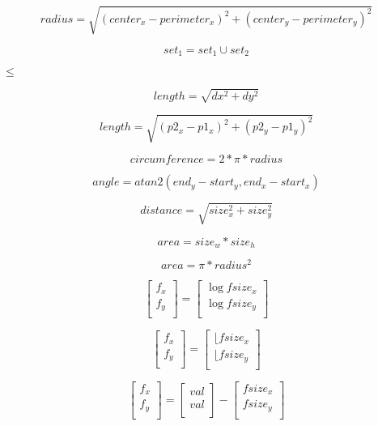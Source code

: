 \documentclass{article}
\begin{document}
\[ radius=\sqrt{(center_x-perimeter_x)^2+(center_y-perimeter_y)^2} \]
\pagebreak

\[ set_1 = set_1 \cup set_2 \]
\pagebreak

$\leq$
\pagebreak

\[ length=\sqrt{dx^2+dy^2} \]
\pagebreak

\[ length=\sqrt{(p2_x-p1_x)^2+(p2_y-p1_y)^2} \]
\pagebreak

\[ circumference=2*\pi*radius \]
\pagebreak

\[ angle=atan2(end_y-start_y, end_x-start_x) \]
\pagebreak

\[ distance=\sqrt{size_x^2+size_y^2} \]
\pagebreak

\[ area=size_w*size_h \]
\pagebreak

\[ area=\pi*radius^2 \]
\pagebreak

\[ \left[ \begin{array}{c} f_x \\ f_y \\ \end{array} \right] = \left[ \begin{array}{c} \log fsize_x \\ \log fsize_y \\ \end{array} \right] \]
\pagebreak

\[ \left[ \begin{array}{c} f_x \\ f_y \\ \end{array} \right] = \left[ \begin{array}{c} \lfloor fsize_x \\ \lfloor fsize_y \\ \end{array} \right] \]
\pagebreak

\[ \left[ \begin{array}{c} f_x \\ f_y \\ \end{array} \right] = \left[ \begin{array}{c} val \\ val \\ \end{array} \right] - \left[ \begin{array}{c} fsize_x \\ fsize_y \\ \end{array} \right] \]
\pagebreak
\end{document}

